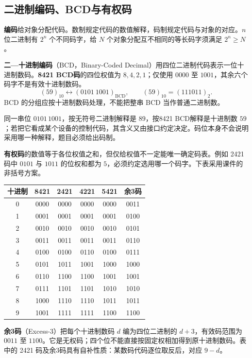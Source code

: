 \documentclass[UTF8,fontset=none,zihao=-4,a4paper]{ctexart}
\newcommand{\term}[1]{\textbf{#1}}
\begin{document}
\subsection{二进制编码、BCD与有权码}
\term{编码}给对象分配代码。数制规定代码的数值解释，码制规定代码与对象的对应。$n$ 位二进制有 $2^n$ 个不同码字，给 $N$ 个对象分配互不相同的等长码字须满足 $2^n\ge N$。

\term{二—十进制编码}（BCD，Binary-Coded Decimal）用四位二进制代码表示一位十进制数码。\term{8421 BCD码}的四位权值为 $8,4,2,1$；仅使用 $0000$ 至 $1001$，其余六个码字不是有效十进制数码。
\[
(59)_{10}\longleftrightarrow(0101\ 1001)_{\mathrm{BCD}},\qquad
(59)_{10}=(111011)_2.
\]
BCD 的分组应按十进制数码处理，不能把整串 BCD 当作普通二进制数。

同一串位 $0101\,1001$，按无符号二进制解释是 $89$，按8421 BCD解释是十进制数 $59$；若把它看成某个设备的控制代码，其含义又由接口约定决定。码位本身不会说明采用哪一种解释，题目必须给出码制。

\term{有权码}的数值等于各位权值之和，但仅给权值不一定能唯一确定码表。例如 2421 码中 $0101$ 与 $1011$ 的位权和都为 $5$，必须约定选用哪一个码字。下表采用课件的非括号方案。
\begin{center}
\begin{tabular}{c c c c c c}
\toprule 十进制 & 8421 & 2421 & 4221 & 5421 & 余3码\\\midrule
0&0000&0000&0000&0000&0011\\
1&0001&0001&0001&0001&0100\\
2&0010&0010&0010&0010&0101\\
3&0011&0011&0011&0011&0110\\
4&0100&0100&0110&0100&0111\\
5&0101&1011&1001&1000&1000\\
6&0110&1100&1100&1001&1001\\
7&0111&1101&1101&1010&1010\\
8&1000&1110&1110&1011&1011\\
9&1001&1111&1111&1100&1100\\\bottomrule
\end{tabular}
\end{center}
\term{余3码}（Excess-3）把每个十进制数码 $d$ 编为四位二进制的 $d+3$，有效码范围为 $0011$ 至 $1100$。它是无权码；四个位不能直接按固定权相加得到原十进制数码。表中的 2421 码及余3码具有自补性质：某数码代码逐位取反后，对应 $9-d$。
\end{document}
